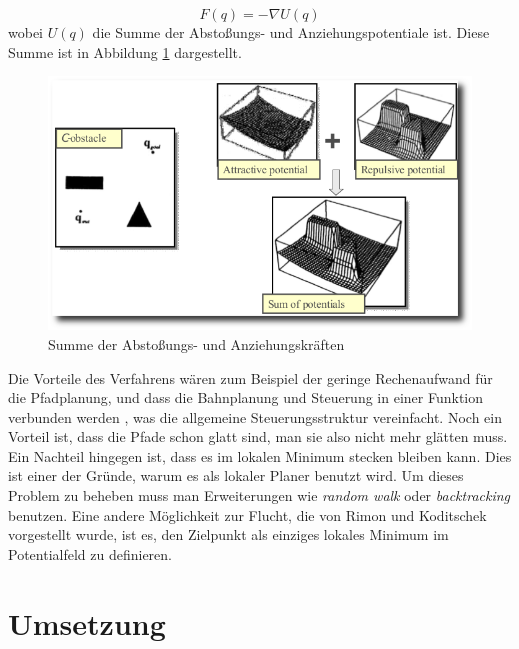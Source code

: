 \begin{equation}
F(q) = - \nabla U(q)
\end{equation}
wobei $U(q)$ die Summe der Abstoßungs- und Anziehungspotentiale ist.
Diese Summe ist in Abbildung \ref{fig:potentialfeld} dargestellt.

\begin{figure}[h]
\center
\includegraphics[scale=0.4]{graphics/potentialfeld.png}
\caption{\label{fig:potentialfeld} Summe der Abstoßungs- und Anziehungskräften \citep{innoKonz}}
\end{figure}

Die Vorteile des Verfahrens wären zum Beispiel der geringe Rechenaufwand für die Pfadplanung, und dass die Bahnplanung und Steuerung in einer Funktion verbunden werden \citep{mobileRobotics}, was die allgemeine Steuerungsstruktur vereinfacht.
Noch ein Vorteil ist, dass die Pfade schon glatt sind, man sie also nicht mehr glätten muss.
Ein Nachteil hingegen ist, dass es im lokalen Minimum stecken bleiben kann.
Dies ist einer der Gründe, warum es als lokaler Planer benutzt wird.
Um dieses Problem zu beheben muss man Erweiterungen wie  \textit{random walk} oder \textit{backtracking} benutzen.
Eine andere Möglichkeit zur Flucht, die von Rimon und Koditschek vorgestellt wurde, ist es, den Zielpunkt als einziges lokales Minimum im Potentialfeld zu definieren.




\section{Umsetzung}
\label{bahnplanung_umsetzung_sec}


